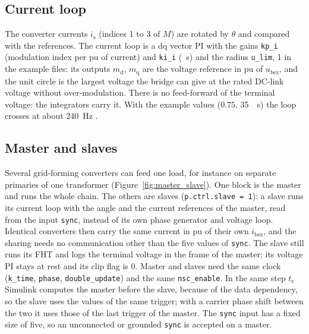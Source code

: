 \documentclass[11pt,a4paper]{scrartcl}
\newcommand{\ped}[1]{_{\mathrm{#1}}}
\newcommand{\code}[1]{\texttt{#1}}
\begin{document}
\begin{onehalfspace}
\subsection{Current loop}
\label{sec:gfm_current_loop}

The converter currents $i\ped{s}$ (indices 1 to 3 of $M$) are rotated by $\theta$ and compared with the references. The current loop is a dq vector PI with the gains \code{kp\_i} (modulation index per pu of current) and \code{ki\_i} (\si{\per\second}) and the radius \code{u\_lim}, 1 in the example files: its outputs $m\ped{d}$, $m\ped{q}$ are the voltage reference in pu of $u\ped{bez}$, and the unit circle is the largest voltage the bridge can give at the rated DC-link voltage without over-modulation. There is no feed-forward of the terminal voltage: the integrators carry it. With the example values ($0.75$, \SI{35}{\per\second}) the loop crosses at about \SI{240}{\hertz} \cite{gfm_note}.

\subsection{Master and slaves}
\label{sec:master_slave}

Several grid-forming converters can feed one load, for instance on separate primaries of one transformer (Figure~\ref{fig:master_slave}). One block is the master and runs the whole chain. The others are slaves (\code{p.ctrl.slave = 1}): a slave runs its current loop with the angle and the current references of the master, read from the input \code{sync}, instead of its own phase generator and voltage loop. Identical converters then carry the same current in pu of their own $i\ped{bez}$, and the sharing needs no communication other than the five values of \code{sync}. The slave still runs its FHT and logs the terminal voltage in the frame of the master; its voltage PI stays at rest and its clip flag is 0. Master and slaves need the same clock (\code{k\_time}, \code{phase}, \code{double\_update}) and the same \code{nsc\_enable}. In the same step $t\ped{c}$ Simulink computes the master before the slave, because of the data dependency, so the slave uses the values of the same trigger; with a carrier phase shift between the two it uses those of the last trigger of the master. The \code{sync} input has a fixed size of five, so an unconnected or grounded \code{sync} is accepted on a master.


\end{onehalfspace}
\end{document}

